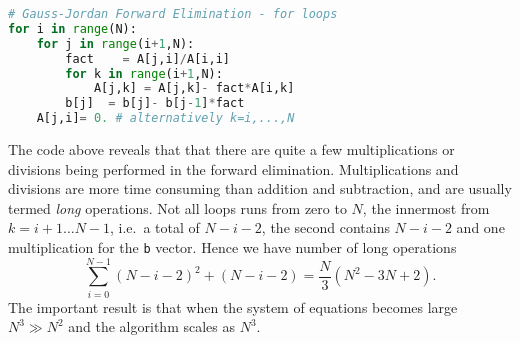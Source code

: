 \documentclass[graybox,sectrefs,envcountresetchap,open=right,final]{svmonodo}
\newenvironment{graybox2admon}[1][]{
\begin{graybox2mdframed}[frametitle=#1]
}
{
\end{graybox2mdframed}
}
\begin{document}
\begin{lstlisting}[language=python,style=blue1bar]
# Gauss-Jordan Forward Elimination - for loops
for i in range(N):
    for j in range(i+1,N):
        fact    = A[j,i]/A[i,i]
        for k in range(i+1,N):
            A[j,k] = A[j,k]- fact*A[i,k]
        b[j]  = b[j]- b[j-1]*fact
	A[j,i]= 0. # alternatively k=i,...,N

\end{lstlisting}




\begin{graybox2admon}[Number of (long) operations]
The code above reveals that that there are quite a few multiplications or divisions being performed in the forward elimination. Multiplications and divisions are more time consuming than addition and subtraction, and are usually termed \emph{long} operations. Not all loops runs from zero to $N$, the innermost from $k=i+1\ldots N-1$, i.e.~a total of $N-i-2$, the second contains $N-i-2$ and one multiplication for the \texttt{b} vector. Hence we have number of long operations
\begin{equation}
\sum_{i=0}^{N-1}(N-i-2)^2+(N-i-2)=\frac{N}{3}(N^2-3N+2).
\label{}
\end{equation}
The important result is that when the system of equations becomes large $N^3\gg N^2$ and the algorithm scales as $N^3$.
\end{graybox2admon}
\end{document}
